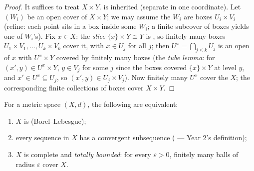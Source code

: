 \begin{proof}
It suffices to treat $X \times Y$.  is inherited
(separate in one coordinate). Let $(W_i)$ be an open cover of $X
\times Y$; we may assume the $W_i$ are  boxes $U_i \times
V_i$ (refine: each point sits in a box inside some $W_i$; a
finite subcover of boxes yields one of $W_i$'s). Fix $x \in X$:
the \emph{slice} $\{x\}\times Y \cong Y$ is , so finitely
many boxes $U_1\times V_1, \dots, U_k\times V_k$ cover it, with
$x \in U_j$ for all $j$; then $U^x = \bigcap_{j \leq k} U_j$ is
an open  of $x$ with $U^x \times Y$ covered by
finitely many boxes (the \emph{tube lemma}:
for $(x', y) \in U^x \times Y$, $y \in V_j$
for some $j$ since the boxes covered $\{x\}\times Y$ at level
$y$, and $x' \in U^x \subseteq U_j$, so $(x', y) \in U_j
\times V_j$). Now finitely many $U^x$
cover the  $X$; the corresponding finite collections of
boxes cover $X \times Y$.
\end{proof}

\begin{theorem}
\label{thm:b3:topology:metriccompact}
For a metric space $(X, d)$, the following are
equivalent:
\begin{enumerate}
  \item $X$ is  (Borel--Lebesgue);
  \item every sequence in $X$ has a convergent subsequence
        ( --- Year 2's definition);
  \item $X$ is complete and \emph{totally bounded}: for every
        $\varepsilon > 0$, finitely many balls of radius
        $\varepsilon$ cover $X$.
\end{enumerate}
\end{theorem}

